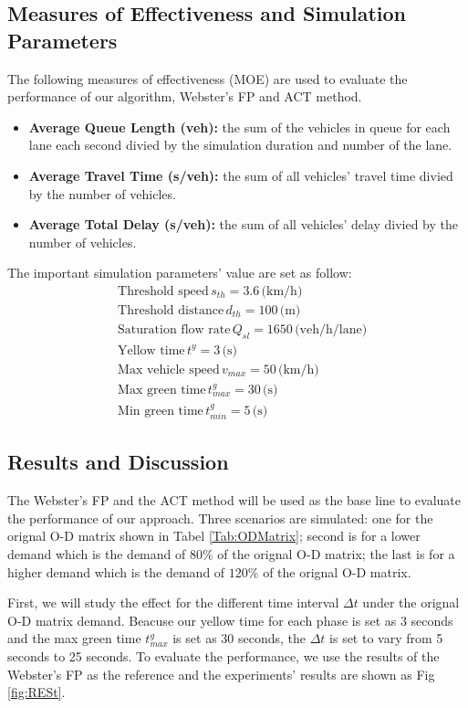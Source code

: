\documentclass[a4paper, 10pt, conference]{ieeeconf}      %
\begin{document}
\subsection{Measures of Effectiveness and Simulation Parameters}
The following measures of effectiveness (MOE) are used to evaluate the performance of our algorithm, Webster's FP and ACT method. 
\begin{itemize}
        \item \textbf{Average Queue Length (veh):} the sum of the vehicles in queue for each lane each second divied by the simulation duration 
        and number of the lane. 
        \item \textbf{Average Travel Time (s/veh):} the sum of all vehicles' travel time divied by the number of vehicles.
        \item \textbf{Average Total Delay (s/veh):} the sum of all vehicles' delay divied by the number of vehicles.
\end{itemize}

The important simulation parameters' value are set as follow:
\begin{align*}
        &\text{Threshold speed}\, s_{th}=3.6\,\text{(km/h)}\\
        &\text{Threshold distance}\, d_{th}=100\,\text{(m)}\\
        &\text{Saturation flow rate}\, Q_{sl}=1650\,\text{(veh/h/lane)}\\
        &\text{Yellow time}\, t^y=3\,\text{(s)}\\
        &\text{Max vehicle speed}\, v_{max}=50\,\text{(km/h)}\\
        &\text{Max green time}\, t^g_{max}=30\,\text{(s)}\\
        &\text{Min green time}\, t^g_{min}=5\,\text{(s)}
\end{align*} 

\subsection{Results and Discussion}

The Webster's FP and the ACT method will be used as the base line to evaluate the performance of our approach. Three scenarios are 
simulated: one for the orignal O-D matrix shown in Tabel \ref{Tab:ODMatrix}; second is for a lower demand which is the demand of $80\%$ of
the orignal O-D matrix; the last is for a higher demand which is the demand of $120\%$ of the orignal O-D matrix. 

First, we will study the effect for the different time interval $\Delta t$ under the orignal O-D matrix demand. Beacuse our yellow time for 
each phase is set as 3 seconds and the max green time $t_{max}^g$ is set as 30 seconds, the $\Delta t$ is set to vary from 5 seconds to 25 seconds.
To evaluate the performance, we use the results of the Webster's FP as the reference and the experiments' results are shown as Fig \ref{fig:RESt}.
\end{document}
